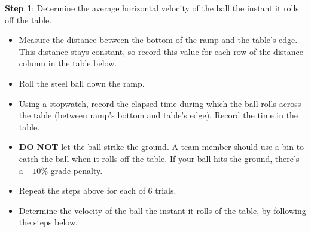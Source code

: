 \documentclass[../main-physics-problems.tex]{subfiles}
\begin{document}
\vspace{1em}

\noindent \textbf{Step 1}: Determine the average horizontal velocity of the ball the instant it rolls off the table.

\begin{itemize}[itemsep=0pt,topsep=2pt]
    \item Measure the distance between the bottom of the ramp and the table's edge. This distance stays constant, so record this value for each row of the distance column in the table below.
    \item Roll the steel ball down the ramp.
    \item Using a stopwatch, record the elapsed time during which the ball rolls across the table (between ramp's bottom and table's edge). Record the time in the table.
    \item \textbf{DO NOT} let the ball strike the ground. A team member should use a bin to catch the ball when it rolls off the table. If your ball hits the ground, there's a $-10\%$ grade penalty.
    \item Repeat the steps above for each of 6 trials.
    \item Determine the velocity of the ball the instant it rolls of the table, by following the steps below.
\end{itemize}

\begin{center}
\end{center}
\end{document}
